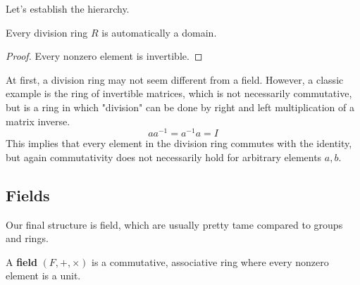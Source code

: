   Let's establish the hierarchy. 

  \begin{lemma}
    Every division ring $R$ is automatically a domain. 
  \end{lemma}
  \begin{proof}
    Every nonzero element is invertible. 
  \end{proof}

  \begin{example}
    At first, a division ring may not seem different from a field. However, a classic example is the ring of invertible matrices, which is not necessarily commutative, but is a ring in which "division" can be done by right and left multiplication of a matrix inverse. 
    \begin{equation}
      a a^{-1} = a^{-1} a = I
    \end{equation}
    This implies that every element in the division ring commutes with the identity, but again commutativity does not necessarily hold for arbitrary elements $a, b$. 
  \end{example} 

\subsection{Fields}

  Our final structure is field, which are usually pretty tame compared to groups and rings. 

  \begin{definition}[Field]
    A \textbf{field} $(F, +, \times)$ is a commutative, associative ring where every nonzero element is a unit. 
  \end{definition}

